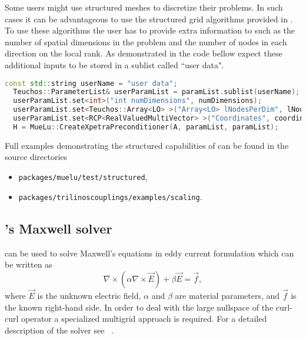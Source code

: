 Some users might use structured meshes to discretize their problems. In such cases it can be advantageous to use the structured grid algorithms provided in \muelu. To use these algorithms the user has to provide extra information to \muelu such as the number of spatial dimensions in the problem and the number of nodes in each direction on the local rank. As demonstrated in the code bellow \muelu expect these additional inputs to be stored in a sublist called ``user data".
\begin{lstlisting}[language=C++]
  const std::string userName = "user data";
  Teuchos::ParameterList& userParamList = paramList.sublist(userName);
  userParamList.set<int>("int numDimensions", numDimensions);
  userParamList.set<Teuchos::Array<LO> >("Array<LO> lNodesPerDim", lNodesPerDim);
  userParamList.set<RCP<RealValuedMultiVector> >("Coordinates", coordinates);
  H = MueLu::CreateXpetraPreconditioner(A, paramList, paramList);
\end{lstlisting}
Full examples demonstrating the structured capabilities of \muelu can be found in the \trilinos source directories
\begin{itemize}
  \setlength{\itemsep}{-10pt}
\item \texttt{packages/muelu/test/structured},
\item \texttt{packages/trilinoscouplings/examples/scaling}.
\end{itemize}


\subsection{\muelu's Maxwell solver}

\muelu can be used to solve Maxwell's equations in eddy current formulation which can be written as
\begin{equation}
  \nabla\times \left(\alpha \nabla  \times \vec{E}\right) + \beta \vec{E} = \vec{f}, \label{eq:maxwell}
\end{equation}
where \(\vec{E}\) is the unknown electric field, \(\alpha\) and \(\beta\) are material parameters,
and \(\vec{f}\) is the known right-hand side.
In order to deal with the large nullspace of the curl-curl operator a specialized multigrid approach
is required.
For a detailed description of the solver see ~\cite{RefMaxwell2008}.

